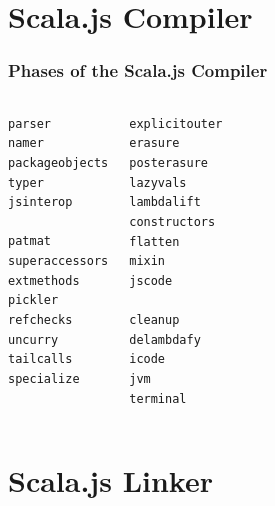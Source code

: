\documentclass{beamer}
\begin{document}
\section{Scala.js Compiler}

\begin{frame}
  \frametitle{Phases of the Scala.js Compiler}

  \begin{columns}[t]
    \begin{alltt}
      parser\\
      namer\\
      packageobjects\\
      typer\\
      \alert<2>{jsinterop\\}
      patmat\\
      superaccessors\\
      extmethods\\
      pickler\\
      refchecks\\
      uncurry\\
      tailcalls\\
      specialize\\
    \end{alltt}

    \begin{alltt}
      explicitouter\\
      erasure\\
      posterasure\\
      lazyvals\\
      lambdalift\\
      constructors\\
      flatten\\
      mixin\\
      \alert<2>{jscode\\}
      cleanup\\
      delambdafy\\
      icode\\
      jvm\\
      terminal
    \end{alltt}
  \end{columns}
\end{frame}

\section{Scala.js Linker}
\end{document}
